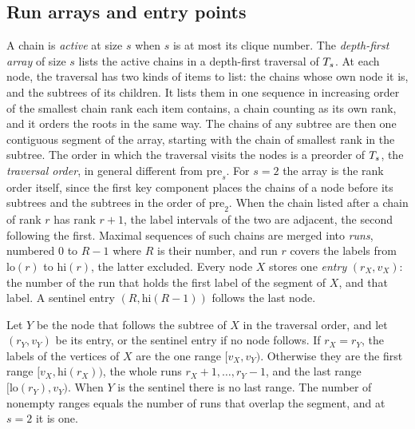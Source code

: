 \subsection{Run arrays and entry points}\label{sec:runs}
A chain is \textit{active} at size $s$ when $s$ is at most its clique number.
%
The \textit{depth-first array} of size $s$ lists the active chains in a depth-first traversal of $T_{s}$.
%
At each node, the traversal has two kinds of items to list: the chains whose own node it is, and the subtrees of its children.
%
It lists them in one sequence in increasing order of the smallest chain rank each item contains, a chain counting as its own rank, and it orders the roots in the same way.
%
The chains of any subtree are then one contiguous segment of the array, starting with the chain of smallest rank in the subtree.
%
The order in which the traversal visits the nodes is a preorder of $T_{s}$, the \textit{traversal order}, in general different from $\mathrm{pre}_s$.
%
For $s=2$ the array is the rank order itself, since the first key component places the chains of a node before its subtrees and the subtrees in the order of $\mathrm{pre}_2$.
%
When the chain listed after a chain of rank $r$ has rank $r+1$, the label intervals of the two are adjacent, the second following the first.
%
Maximal sequences of such chains are merged into \textit{runs}, numbered $0$ to $R-1$ where $R$ is their number, and run $r$ covers the labels from $\mathrm{lo}(r)$ to $\mathrm{hi}(r)$, the latter excluded.
%
Every node $X$ stores one \textit{entry} $(r_X,v_X)$: the number of the run that holds the first label of the segment of $X$, and that label.
%
A sentinel entry $(R,\mathrm{hi}(R-1))$ follows the last node.
\begin{theorem}[retrieval]\label{thm:retrieval}
Let $Y$ be the node that follows the subtree of $X$ in the traversal order, and let $(r_Y,v_Y)$ be its entry, or the sentinel entry if no node follows.
%
If $r_X=r_Y$, the labels of the vertices of $X$ are the one range $[v_X,v_Y)$.
%
Otherwise they are the first range $[v_X,\mathrm{hi}(r_X))$, the whole runs $r_X+1,\dots,r_Y-1$, and the last range $[\mathrm{lo}(r_Y),v_Y)$.
%
When $Y$ is the sentinel there is no last range.
%
The number of nonempty ranges equals the number of runs that overlap the segment, and at $s=2$ it is one.
\end{theorem}
